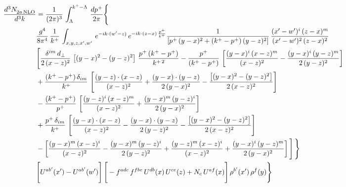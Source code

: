 \documentclass[9pt]{article}
\numberwithin{equation}{section}
\begin{document}
\begin{align}
    \frac{d^{3}N_{2a\,\rm NLO}^{\rm}}{d^{3}k}  & =  \frac{1}{(2\pi)^{3}}\,\int_{\Lambda}^{k^{+}-\Lambda}\, \frac{dp^{+}}{2\pi}\Bigg\{\notag \\ & \frac{g^{4}}{8\pi^{4}}\,\frac{1}{k^{+}}\, \int_{x,y,z,x',w'}\,e^{-ik\cdot(w'-z)}\,e^{-ik\cdot (z-x)\,\frac{p^{+}}{k^{+}}}\frac{1}{\left[p^{+}\,(y-x)^{2}+(k^{+}-p^{+})\,(y-z)^{2}\right]}\, \frac{(x'-w')^{i}\,(z-x)^{m}}{(x'-w')^{2}\,(z-x)^{2}} \notag \\ & \Bigg[\frac{\delta^{im}\,d_{\perp}}{2\,(x-z)^{2}}\,\left[(y-x)^{2}-(y-z)^{2}\right]\,\frac{p^{+}\,(k^{+}-p^{+})}{k^{+\,2}}-\frac{p^{+}}{(k^{+}-p^{+})}\,\left[\frac{(y-x)^{i}\,(x-z)^{m}}{(x-z)^{2}}-\frac{(y-x)^{i}\,(y-z)^{m}}{2\,(y-z)^{2}}\right]\notag \\ & +\frac{(k^{+}-p^{+})\,\delta_{im}}{k^{+}}\,\left[\frac{(y-z)\cdot (x-z)}{(x-z)^{2}}+\frac{(y-x)\cdot (y-z)}{2\,(y-x)^{2}}-\frac{\left[(y-x)^{2}-(y-z)^{2}\right]}{2\,(x-z)^{2}}\right]\notag \\ & -\frac{(k^{+}-p^{+})}{p^{+}}\,\left[\frac{(y-z)^{i}\,(x-z)^{m}}{(x-z)^{2}}+\frac{(y-x)^{m}\,(y-z)^{i}}{2\,(y-x)^{2}}\right]\notag \\ & +\frac{p^{+}\,\delta_{im}}{k^{+}}\,\left[\frac{(y-x)\cdot (x-z)}{(x-z)^{2}}-\frac{(y-x)\cdot (y-z)}{2\,(y-z)^{2}}-\frac{\left[(y-x)^{2}-(y-z)^{2}\right]}{2\,(x-z)^{2}}\right]\notag \\ &-\left[\frac{(y-x)^{m}\,(x-z)^{i}}{(x-z)^{2}}-\frac{(y-x)^{m}\,(y-z)^{i}}{2\,(y-z)^{2}}+\frac{(y-z)^{m}\,(x-z)^{i}}{(x-z)^{2}}+\frac{(y-x)^{i}\,(y-z)^{m}}{2\,(y-x)^{2}}\right]\Bigg]\,\Bigg\} \notag \\ & \Bigg[U^{ab'}(x')-U^{ab'}(w')\Bigg]\,\Bigg[-f^{adc}\,f^{fbe}\,U^{db}(x)\,U^{ce}(z)+N_{c}\,U^{af}(x)\Bigg]\,\rho^{b'}(x')\,\rho^{f}(y)\Bigg\}
\end{align}
\end{document}

